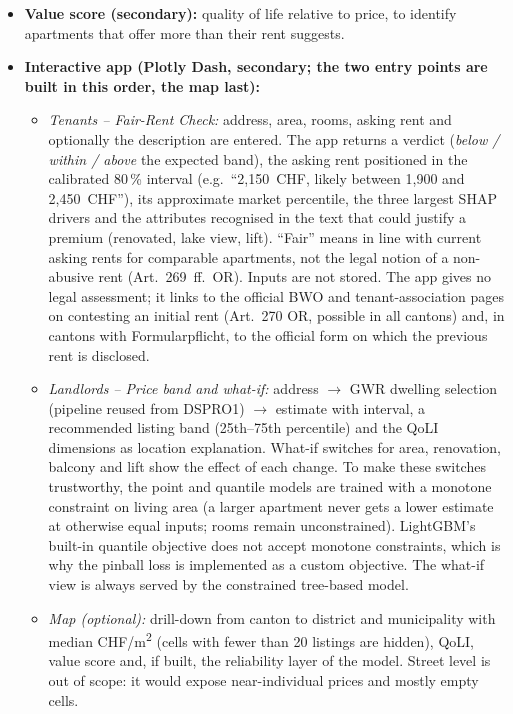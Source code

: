 \documentclass[11pt,a4paper]{article}
\begin{document}
\begin{itemize}
    \item \textbf{Value score (secondary):} quality of life relative to price, to identify apartments that offer more than their rent suggests.
    \item \textbf{Interactive app (Plotly Dash, secondary; the two entry points are built in this order, the map last):}
    \begin{itemize}
        \item \emph{Tenants -- Fair-Rent Check:} address, area, rooms, asking rent and optionally the description are entered. The app returns a verdict (\emph{below / within / above} the expected band), the asking rent positioned in the calibrated 80\,\% interval (e.g.\ ``2{,}150~CHF, likely between 1{,}900 and 2{,}450~CHF''), its approximate market percentile, the three largest SHAP drivers and the attributes recognised in the text that could justify a premium (renovated, lake view, lift). ``Fair'' means in line with current asking rents for comparable apartments, not the legal notion of a non-abusive rent (Art.~269~ff.\ OR). Inputs are not stored. The app gives no legal assessment; it links to the official BWO and tenant-association pages on contesting an initial rent (Art.~270 OR, possible in all cantons) and, in cantons with Formularpflicht, to the official form on which the previous rent is disclosed.
        \item \emph{Landlords -- Price band and what-if:} address $\rightarrow$ GWR dwelling selection (pipeline reused from DSPRO1) $\rightarrow$ estimate with interval, a recommended listing band (25th--75th percentile) and the QoLI dimensions as location explanation. What-if switches for area, renovation, balcony and lift show the effect of each change. To make these switches trustworthy, the point and quantile models are trained with a monotone constraint on living area (a larger apartment never gets a lower estimate at otherwise equal inputs; rooms remain unconstrained). LightGBM's built-in quantile objective does not accept monotone constraints, which is why the pinball loss is implemented as a custom objective. The what-if view is always served by the constrained tree-based model.
        \item \emph{Map (optional):} drill-down from canton to district and municipality with median CHF/m\textsuperscript{2} (cells with fewer than 20 listings are hidden), QoLI, value score and, if built, the reliability layer of the model. Street level is out of scope: it would expose near-individual prices and mostly empty cells.
    \end{itemize}
\end{itemize}
\end{document}
